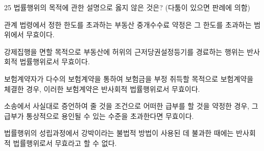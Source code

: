 \begin{question}{25}
법률행위의 목적에 관한 설명으로 옳지 않은 것은? (다툼이 있으면 판례에 의함)
\begin{choices}
  \item 관계 법령에서 정한 한도를 초과하는 부동산 중개수수료 약정은 그 한도를 초과하는 범위에서 무효이다.
  \item 강제집행을 면할 목적으로 부동산에 허위의 근저당권설정등기를 경료하는 행위는 반사회적 법률행위로서 무효이다.
  \item 보험계약자가 다수의 보험계약을 통하여 보험금을 부정 취득할 목적으로 보험계약을 체결한 경우, 이러한 보험계약은 반사회적 법률행위로서 무효이다.
  \item 소송에서 사실대로 증언하여 줄 것을 조건으로 어떠한 급부를 할 것을 약정한 경우, 그 급부가 통상적으로 용인될 수 있는 수준을 초과한다면 무효이다.
  \item 법률행위의 성립과정에서 강박이라는 불법적 방법이 사용된 데 불과한 때에는 반사회적 법률행위로서 무효라고 할 수 없다.
\end{choices}
\end{question}
